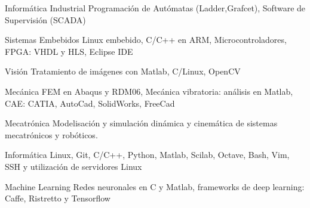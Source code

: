





\begin{cvskills}

\cvskill
{Informática Industrial} %
{Programación de Autómatas (Ladder,Grafcet), Software de Supervisión (SCADA) } %

\cvskill
{Sistemas Embebidos} %
{Linux embebido, C/C++ en ARM, Microcontroladores, FPGA: VHDL y HLS, Eclipse IDE} %

\cvskill
{Visión} %
{Tratamiento de imágenes con Matlab, C/Linux, OpenCV} %

\cvskill
{Mecánica} %
{FEM en Abaqus y RDM06, Mecánica vibratoria: análisis en Matlab, CAE: CATIA, AutoCad, SolidWorks, FreeCad} %

\cvskill
{Mecatrónica} %
{Modelisación y simulación dinámica y cinemática de sistemas mecatrónicos y robóticos.} %

\cvskill
{Informática} %
{Linux, Git, C/C++, Python, Matlab, Scilab, Octave, Bash, Vim, SSH y utilización de
servidores Linux} %

%
\cvskill
{Machine Learning} %
{Redes neuronales en C y Matlab, frameworks de deep learning: Caffe, Ristretto y
Tensorflow}
\end{cvskills}
